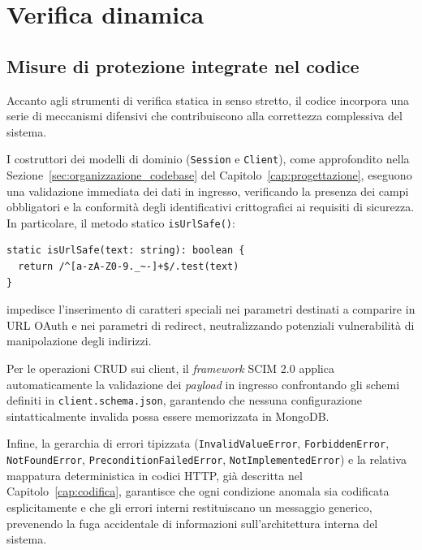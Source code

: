 \section{Verifica dinamica}
\label{sec:verifica_dinamica}

\subsection{Misure di protezione integrate nel codice}
\label{subsec:misure_protezione}
Accanto agli strumenti di verifica statica in senso stretto, il codice incorpora una serie di meccanismi difensivi che contribuiscono alla correttezza complessiva del sistema.

I costruttori dei modelli di dominio (\texttt{Session} e \texttt{Client}), come approfondito nella Sezione~\ref{sec:organizzazione_codebase} del Capitolo~\ref{cap:progettazione}, eseguono una validazione immediata dei dati in ingresso, verificando la presenza dei campi obbligatori e la conformità degli identificativi crittografici ai requisiti di sicurezza. In particolare, il metodo statico \texttt{isUrlSafe()}:
\begin{listing}[H]
\begin{verbatim}
static isUrlSafe(text: string): boolean {
  return /^[a-zA-Z0-9._~-]+$/.test(text)
}
\end{verbatim}
\caption{Metodo \texttt{isUrlSafe} per la validazione di stringhe URL-safe}
\label{listing:is_url_safe}
\end{listing}
impedisce l'inserimento di caratteri speciali nei parametri destinati a comparire in URL OAuth e nei parametri di redirect, neutralizzando potenziali vulnerabilità di manipolazione degli indirizzi.

Per le operazioni CRUD sui client, il \textit{framework} SCIM 2.0 applica automaticamente la validazione dei \textit{payload} in ingresso confrontando gli schemi definiti in \texttt{client.schema.json}, garantendo che nessuna configurazione sintatticalmente invalida possa essere memorizzata in MongoDB.

Infine, la gerarchia di errori tipizzata (\texttt{InvalidValueError}, \texttt{ForbiddenError}, \texttt{NotFoundError}, \texttt{PreconditionFailedError}, \texttt{NotImplementedError}) e la relativa mappatura deterministica in codici HTTP, già descritta nel Capitolo~\ref{cap:codifica}, garantisce che ogni condizione anomala sia codificata esplicitamente e che gli errori interni restituiscano un messaggio generico, prevenendo la fuga accidentale di informazioni sull'architettura interna del sistema.

